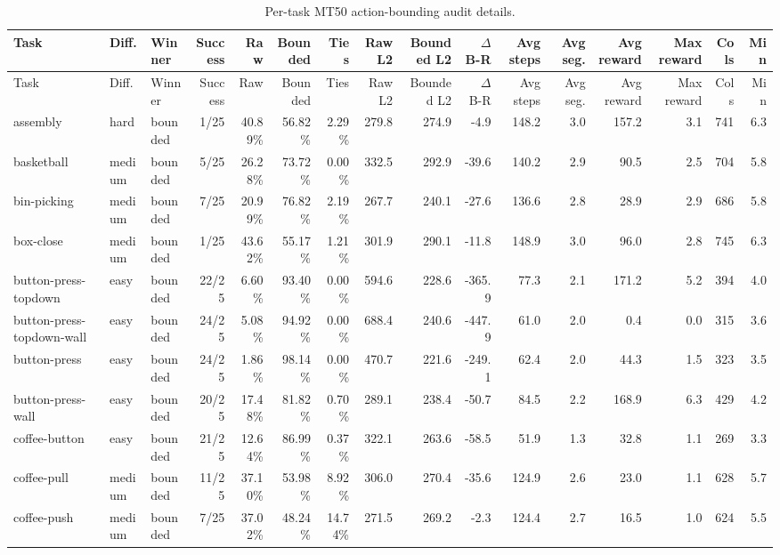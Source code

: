 \begin{landscape}
\small
\begin{longtable}{@{}l l l r r r r r r r r r r r r r@{}}
\caption{Per-task MT50 action-bounding audit details.}\label{tab:action-audit-per-task}\\
\toprule
Task & Diff. & Winner & Success & Raw & Bounded & Ties & Raw L2 & Bounded L2 & $\Delta$ B-R & Avg steps & Avg seg. & Avg reward & Max reward & Cols & Min \\ 
\midrule
\endfirsthead
\toprule
Task & Diff. & Winner & Success & Raw & Bounded & Ties & Raw L2 & Bounded L2 & $\Delta$ B-R & Avg steps & Avg seg. & Avg reward & Max reward & Cols & Min \\ 
\midrule
\endhead
assembly & hard & bounded & 1/25 & 40.89\% & 56.82\% & 2.29\% & 279.8 & 274.9 & -4.9 & 148.2 & 3.0 & 157.2 & 3.1 & 741 & 6.3 \\
basketball & medium & bounded & 5/25 & 26.28\% & 73.72\% & 0.00\% & 332.5 & 292.9 & -39.6 & 140.2 & 2.9 & 90.5 & 2.5 & 704 & 5.8 \\
bin-picking & medium & bounded & 7/25 & 20.99\% & 76.82\% & 2.19\% & 267.7 & 240.1 & -27.6 & 136.6 & 2.8 & 28.9 & 2.9 & 686 & 5.8 \\
box-close & medium & bounded & 1/25 & 43.62\% & 55.17\% & 1.21\% & 301.9 & 290.1 & -11.8 & 148.9 & 3.0 & 96.0 & 2.8 & 745 & 6.3 \\
button-press-topdown & easy & bounded & 22/25 & 6.60\% & 93.40\% & 0.00\% & 594.6 & 228.6 & -365.9 & 77.3 & 2.1 & 171.2 & 5.2 & 394 & 4.0 \\
button-press-topdown-wall & easy & bounded & 24/25 & 5.08\% & 94.92\% & 0.00\% & 688.4 & 240.6 & -447.9 & 61.0 & 2.0 & 0.4 & 0.0 & 315 & 3.6 \\
button-press & easy & bounded & 24/25 & 1.86\% & 98.14\% & 0.00\% & 470.7 & 221.6 & -249.1 & 62.4 & 2.0 & 44.3 & 1.5 & 323 & 3.5 \\
button-press-wall & easy & bounded & 20/25 & 17.48\% & 81.82\% & 0.70\% & 289.1 & 238.4 & -50.7 & 84.5 & 2.2 & 168.9 & 6.3 & 429 & 4.2 \\
coffee-button & easy & bounded & 21/25 & 12.64\% & 86.99\% & 0.37\% & 322.1 & 263.6 & -58.5 & 51.9 & 1.3 & 32.8 & 1.1 & 269 & 3.3 \\
coffee-pull & medium & bounded & 11/25 & 37.10\% & 53.98\% & 8.92\% & 306.0 & 270.4 & -35.6 & 124.9 & 2.6 & 23.0 & 1.1 & 628 & 5.7 \\
coffee-push & medium & bounded & 7/25 & 37.02\% & 48.24\% & 14.74\% & 271.5 & 269.2 & -2.3 & 124.4 & 2.7 & 16.5 & 1.0 & 624 & 5.5 \\

\end{longtable}
\end{landscape}
